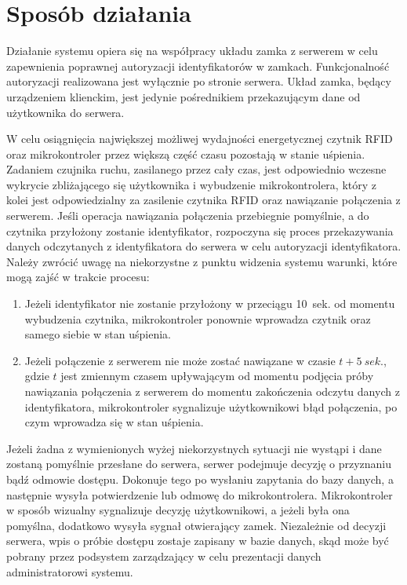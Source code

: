         \pagebreak

        \section{Sposób działania}
            Działanie systemu opiera się na współpracy układu zamka z serwerem w celu zapewnienia poprawnej autoryzacji identyfikatorów w zamkach. Funkcjonalność autoryzacji realizowana jest wyłącznie po stronie serwera. Układ zamka, będący urządzeniem klienckim, jest jedynie pośrednikiem przekazującym dane od użytkownika do serwera.

            W celu osiągnięcia największej możliwej wydajności energetycznej czytnik RFID oraz mikrokontroler przez większą część czasu pozostają w stanie uśpienia. Zadaniem czujnika ruchu, zasilanego przez cały czas, jest odpowiednio wczesne wykrycie zbliżającego się użytkownika i wybudzenie mikrokontrolera, który z kolei jest odpowiedzialny za zasilenie czytnika RFID oraz nawiązanie połączenia z serwerem. Jeśli operacja nawiązania połączenia przebiegnie pomyślnie, a do czytnika przyłożony zostanie identyfikator, rozpoczyna się proces przekazywania danych odczytanych z identyfikatora do serwera w celu autoryzacji identyfikatora. Należy zwrócić uwagę na niekorzystne z punktu widzenia systemu warunki, które mogą zajść w trakcie procesu:

            \begin{enumerate}
                \item
                    Jeżeli identyfikator nie zostanie przyłożony w przeciągu 10~sek. od momentu wybudzenia czytnika, mikrokontroler ponownie wprowadza czytnik oraz samego siebie w stan uśpienia.
                \item
                    Jeżeli połączenie z serwerem nie może zostać nawiązane w czasie \(t + 5~sek.\), gdzie \(t\) jest zmiennym czasem upływającym od momentu podjęcia próby nawiązania połączenia z serwerem do momentu zakończenia odczytu danych z identyfikatora, mikrokontroler sygnalizuje użytkownikowi błąd połączenia, po czym wprowadza się w stan uśpienia.
            \end{enumerate}

            Jeżeli żadna z wymienionych wyżej niekorzystnych sytuacji nie wystąpi i dane zostaną pomyślnie przesłane do serwera, serwer podejmuje decyzję o przyznaniu bądź odmowie dostępu. Dokonuje tego po wysłaniu zapytania do bazy danych, a następnie wysyła potwierdzenie lub odmowę do mikrokontrolera. Mikrokontroler w sposób wizualny sygnalizuje decyzję użytkownikowi, a jeżeli była ona pomyślna, dodatkowo wysyła sygnał otwierający zamek. Niezależnie od decyzji serwera, wpis o próbie dostępu zostaje zapisany w bazie danych, skąd może być pobrany przez podsystem zarządzający w celu prezentacji danych administratorowi systemu.

